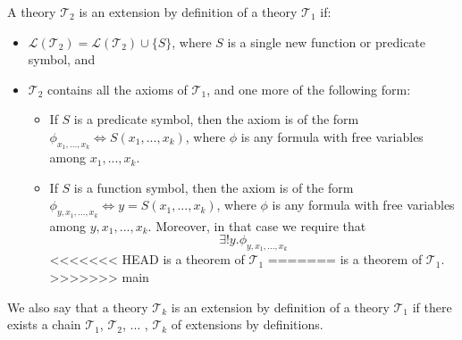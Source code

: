 \begin{defin}
A theory $\mathcal{T}_2$ is an extension by definition of a theory $\mathcal{T}_1$ if:
\begin{itemize}
\item $\mathcal{L}(\mathcal{T}_2) = \mathcal{L}(\mathcal{T}_2) \cup \lbrace S \rbrace$, where $S$ is a single new function or predicate symbol, and
\item $\mathcal{T}_2$ contains all the axioms of $\mathcal{T}_1$, and one more of the following form:
\begin{itemize}
\item If $S$ is a predicate symbol, then the axiom is of the form $\phi_{x_1,...,x_k} \iff S(x_1,...,x_k)$, where $\phi$ is any formula with free variables among $x_1,...,x_k$.
\item If $S$ is a function symbol, then the axiom is of the form $\phi_{y, x_1,...,x_k} \iff y = S(x_1,...,x_k)$, where $\phi$ is any formula with free variables among $y, x_1,...,x_k$.
Moreover, in that case we require that 
$$
\exists ! y. \phi_{y, x_1,...,x_k}
$$
<<<<<<< HEAD
is a theorem of $\mathcal{T}_1$
=======
is a theorem of $\mathcal{T}_1$.
>>>>>>> main
\end{itemize}
\end{itemize}
\end{defin}
We also say that a theory $\mathcal{T}_k$ is an extension by definition of a theory $\mathcal{T}_1$ if there exists a chain $\mathcal{T}_1$, $\mathcal{T}_2$, ... , $\mathcal{T}_k$ of extensions by definitions.


